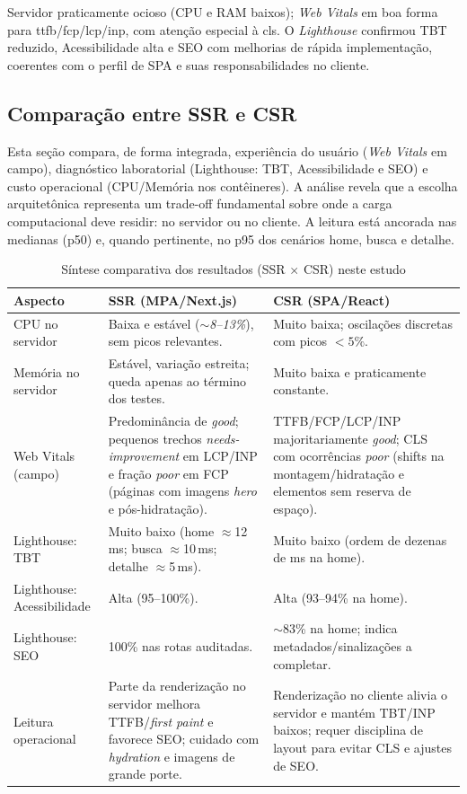 {Servidor praticamente ocioso (CPU e RAM baixos); \emph{Web Vitals} em boa forma para \acrshort{ttfb}/\acrshort{fcp}/\acrshort{lcp}/\acrshort{inp}, com atenção especial à \acrshort{cls}. O \emph{Lighthouse} confirmou TBT reduzido, Acessibilidade alta e SEO com melhorias de rápida implementação, coerentes com o perfil de SPA e suas responsabilidades no cliente.

\subsection{Comparação entre SSR e CSR}
\label{subsec:comparacao-ssr-csr}

Esta seção compara, de forma integrada, experiência do usuário (\emph{Web Vitals} em campo), diagnóstico laboratorial (Lighthouse: TBT, Acessibilidade e SEO) e custo operacional (CPU/Memória nos contêineres). A análise revela que a escolha arquitetônica representa um trade-off fundamental sobre onde a carga computacional deve residir: no servidor ou no cliente. A leitura está ancorada nas medianas (p50) e, quando pertinente, no p95 dos cenários home, busca e detalhe.

\begin{table}[H]
\centering
\caption{Síntese comparativa dos resultados (SSR $\times$ CSR) neste estudo}
\label{tab:comparativo-ssr-csr}
\begin{tabular}{|p{4.2cm}|p{5.2cm}|p{5.2cm}|}
\hline
Aspecto & SSR (MPA/Next.js) & CSR (SPA/React) \\
\hline
CPU no servidor & Baixa e estável (\textit{$\sim$8--13\%}), sem picos relevantes. & Muito baixa; oscilações discretas com picos $<5\%$. \\
\hline
Memória no servidor & Estável, variação estreita; queda apenas ao término dos testes. & Muito baixa e praticamente constante. \\
\hline
Web Vitals (campo) & Predominância de \textit{good}; pequenos trechos \textit{needs-improvement} em LCP/INP e fração \textit{poor} em FCP (páginas com imagens \emph{hero} e pós-hidratação). & TTFB/FCP/LCP/INP majoritariamente \textit{good}; CLS com ocorrências \textit{poor} (shifts na montagem/hidratação e elementos sem reserva de espaço). \\
\hline
Lighthouse: TBT & Muito baixo (home $\approx$12\,ms; busca $\approx$10\,ms; detalhe $\approx$5\,ms). & Muito baixo (ordem de dezenas de ms na home). \\
\hline
Lighthouse: Acessibilidade & Alta (95--100\%). & Alta (93--94\% na home). \\
\hline
Lighthouse: SEO & 100\% nas rotas auditadas. & $\sim$83\% na home; indica metadados/sinalizações a completar. \\
\hline
Leitura operacional & Parte da renderização no servidor melhora TTFB/\emph{first paint} e favorece SEO; cuidado com \emph{hydration} e imagens de grande porte. & Renderização no cliente alivia o servidor e mantém TBT/INP baixos; requer disciplina de layout para evitar CLS e ajustes de SEO. \\
\hline
\end{tabular}
\end{table}

}
